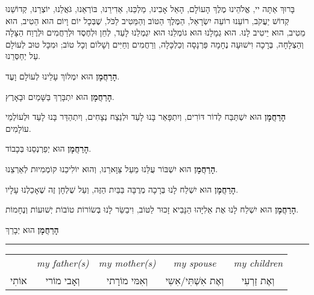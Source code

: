 \vspace{1em}

בָּרוּךְ אַתָּה יי, אֱלֹהֵינוּ מֶלֶךְ הָעוֹלָם, הָאֵל אָבִינוּ, מַלְכֵּנוּ, אַדִירֵנוּ, בּוֹרְאֵנוּ, גֹּאֲלֵנוּ, יוֹצְרֵנוּ, קְדוֹשֵׁנוּ קְדוֹשׁ יַעֲקֹב, רוֹעֵנוּ רוֹעֵה יִשְׂרָאַל, הַמֶּלֶךְ הַטּוֹב וְהַמֵּטִיב לַכֹּל, שֶׁבְּכָל יוֹם וָיוֹם הוּא הֵטִיב, הוּא מֵטִיב, הוּא יֵיטִיב לָנוּ. הוּא גְמָלָנוּ הוּא גוֹמְלֵנוּ הוּא יִגְמְלֵנוּ לָעַד, לְחֵן וּלְחֶסֶד וּלְרַחֲמִים וּלְרֶוַח הַצָּלָה וְהַצְלָחָה, בְּרָכָה וִישׁוּעָה נֶחָמָה פַּרְנָסָה וְכַלְכָּלָה, וְרַחֲמִים וְחַיִּים וְשָׁלוֹם וְכָל טוֹב; וּמִכָּל טוּב לְעוֹלָם עַל יְחַסְּרֵנוּ.

\vspace{1em}

\begin{center}

{\bf הָרַחֲמָן}
הוּא יִמְלוֹךְ עָלֵינוּ לְעוֹלָם וָעֶד.

{\bf הָרַחֲמָן}
הוּא יִתְבָּרַךְ בַּשָּׁמַיִם וּבָאָרֶץ.

{\bf הָרַחֲמָן}
הוּא יִשְׁתַּבַּח לְדוֹר דּוֹרִים, וְיִתְפָּאַר בָּנוּ לָעַד וּלְנֵצַח נְצָחִים, וְיִתְהַדַּר בָּנוּ לָעַד וּלְעוֹלְמֵי עוֹלָמִים.

{\bf הָרַחֲמָן}
הוּא יְפַרְנְסֵנוּ בְּכָבוֹד.

{\bf הָרַחֲמָן}
הוּא יִשְׁבּוֹר עֻלֵּנוּ מֵעַל צַּוָּארֵנוּ, וְהוּא יוֹלִיכֵנוּ קוֹמְמִיוּת לְאַרְצֵנוּ.

{\bf הָרַחֲמָן}
הוּא יִשְׁלַח לָנוּ בְּרָכָה מְרֻבָּה בַּבַּיִת הַזֶּה, וְעַל שֻׁלְחָן זֶה שֶׁאָכַלְנוּ עָלָיו.

{\bf הָרַחֲמָן}
הוּא יִשְׁלַח לָנוּ אֶת אֵלִיָּהוּ הַנָּבִיא זָכוּר לַטּוֹב, וִיבַשֵּׂר לָנוּ בְּשׂוֹרוֹת טוֹבוֹת יְשׁוּעוֹת וְנֶחָמוֹת.



\break

{\large \bf
הָרַחֲמָן
}
הוּא יְבָרֵךְ 
\hrule


\begin{tabular}{c c c c c}

	& \textenglish{\itshape my father(s)}
		& \textenglish{\itshape my mother(s)}
			& \textenglish{\itshape my spouse}
				& \textenglish{\itshape my children}\\
					
אוֹתִי & וְאָבי מוֹרי & וְאִמּי מוֹרָתי & וְאֶת אִשְׁתִּי/אִשִי & וְאֶת זַרְעִי \\
\end{tabular}


\end{center}
